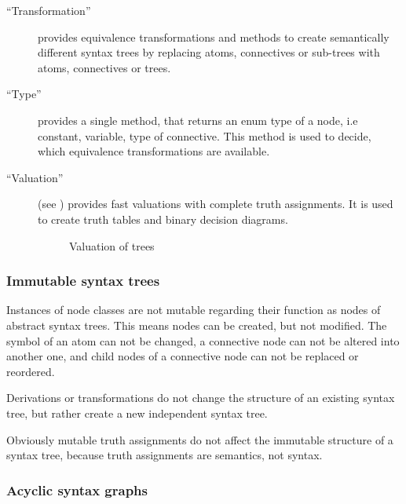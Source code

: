 \begin{description}
\item[“Transformation”]\label{item:TRANSFORMATIONS} provides equivalence transformations 
and methods to create 
 semantically different syntax trees by replacing atoms, connectives or sub-trees with
atoms, connectives or trees.

\item[“Type”] provides a single method, 
that returns an enum type of a node, i.e constant, variable, type of connective. 
This method is used to decide, which equivalence transformations are available.

\item[“Valuation”] (see ) 
provides fast valuations with complete truth assignments. 
It is used to create truth tables and binary decision diagrams. 

\begin{figure}[htbp]
\begin{center}
\caption{Valuation of trees}
\label{fig:NyayaNodeValuation}
\end{center}
\end{figure}

\end{description}
\subsubsection{Immutable syntax trees}

Instances of node classes are not mutable 
regarding their function as nodes of abstract syntax trees. 
This means nodes can be created, but not modified.
The symbol of an atom can not be changed, 
a connective node can not be altered into another one,
and child nodes of a connective node can not be replaced or reordered.

Derivations or transformations do not change the structure of an existing syntax tree,
but rather create a new independent syntax tree.

Obviously mutable truth assignments do not affect the immutable structure of a syntax tree,
because truth assignments are semantics, not syntax. 

\subsubsection{Acyclic syntax graphs}

